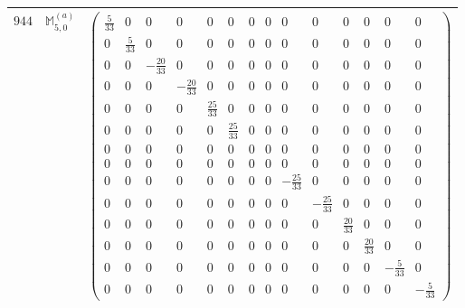 \documentclass[fleqn,8pt,landscape]{jsarticle}
\begin{document}
\begin{center}
\begin{longtable}{ccc}
$ 944 $ & $ \mathbb{M}_{5,0}^{(a)} $ & $ \begin{pmatrix} \frac{5}{33} & 0 & 0 & 0 & 0 & 0 & 0 & 0 & 0 & 0 & 0 & 0 & 0 & 0 \\ 0 & \frac{5}{33} & 0 & 0 & 0 & 0 & 0 & 0 & 0 & 0 & 0 & 0 & 0 & 0 \\ 0 & 0 & - \frac{20}{33} & 0 & 0 & 0 & 0 & 0 & 0 & 0 & 0 & 0 & 0 & 0 \\ 0 & 0 & 0 & - \frac{20}{33} & 0 & 0 & 0 & 0 & 0 & 0 & 0 & 0 & 0 & 0 \\ 0 & 0 & 0 & 0 & \frac{25}{33} & 0 & 0 & 0 & 0 & 0 & 0 & 0 & 0 & 0 \\ 0 & 0 & 0 & 0 & 0 & \frac{25}{33} & 0 & 0 & 0 & 0 & 0 & 0 & 0 & 0 \\ 0 & 0 & 0 & 0 & 0 & 0 & 0 & 0 & 0 & 0 & 0 & 0 & 0 & 0 \\ 0 & 0 & 0 & 0 & 0 & 0 & 0 & 0 & 0 & 0 & 0 & 0 & 0 & 0 \\ 0 & 0 & 0 & 0 & 0 & 0 & 0 & 0 & - \frac{25}{33} & 0 & 0 & 0 & 0 & 0 \\ 0 & 0 & 0 & 0 & 0 & 0 & 0 & 0 & 0 & - \frac{25}{33} & 0 & 0 & 0 & 0 \\ 0 & 0 & 0 & 0 & 0 & 0 & 0 & 0 & 0 & 0 & \frac{20}{33} & 0 & 0 & 0 \\ 0 & 0 & 0 & 0 & 0 & 0 & 0 & 0 & 0 & 0 & 0 & \frac{20}{33} & 0 & 0 \\ 0 & 0 & 0 & 0 & 0 & 0 & 0 & 0 & 0 & 0 & 0 & 0 & - \frac{5}{33} & 0 \\ 0 & 0 & 0 & 0 & 0 & 0 & 0 & 0 & 0 & 0 & 0 & 0 & 0 & - \frac{5}{33} \end{pmatrix} $ \\ \hline

\end{longtable}
\end{center}
\end{document}
